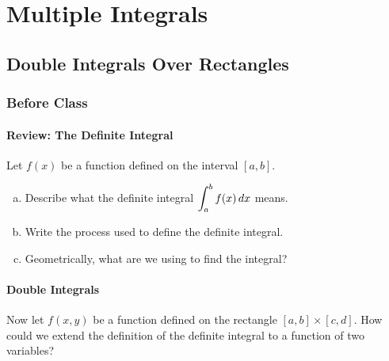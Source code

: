 \documentclass[notes]{subfiles}
\begin{document}
	\chapter{Multiple Integrals}
	\fancyhead[LO,RE]{\bfseries \small \currentname}
	\fancyfoot[C]{{}}
	\fancyfoot[RO,LE]{\large \thepage}	%

\section*{Double Integrals Over Rectangles}\label{cs151}
	\subsection*{Before Class}
	\subsubsection*{Review: The Definite Integral}
		\begin{question}
			Let $f(x)$ be a function defined on the interval $[a,b]$.
			\begin{enumerate}[(a)]
				\item Describe what the definite integral $\displaystyle \int_a^b f(x)\, dx$ means.  
				\item Write the process used to define the definite integral.
				\item Geometrically, what are we using to find the integral?
			\end{enumerate}
		\end{question}
			\newpage
			
	\subsubsection*{ Double Integrals}
		\begin{question}
			Now let $f(x,y)$ be a function defined on the rectangle $[a,b]\times [c,d]$.  How could we extend the definition of the definite integral to a function of two variables?
		\end{question}
\end{document}
